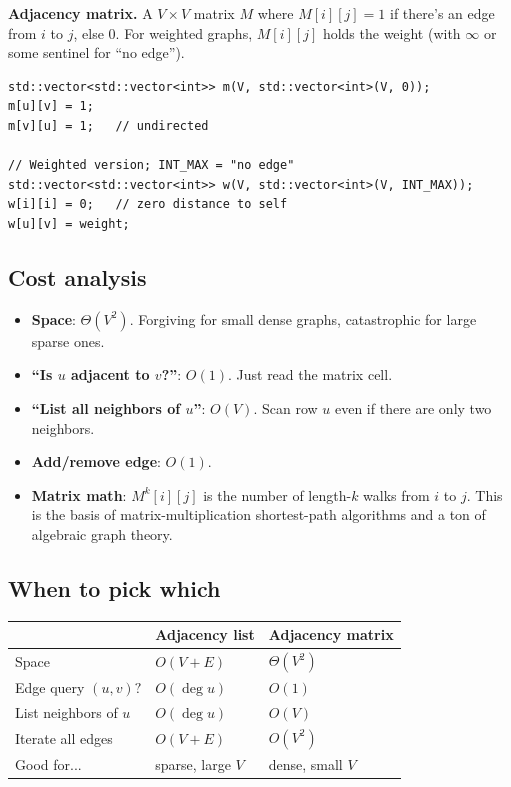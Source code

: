 \documentclass[11pt]{article}
\begin{document}
\begin{defnbox}
\textbf{Adjacency matrix.} A $V \times V$ matrix $M$ where $M[i][j] = 1$ if there's an edge from $i$ to $j$, else $0$. For weighted graphs, $M[i][j]$ holds the weight (with $\infty$ or some sentinel for ``no edge'').
\end{defnbox}

\begin{lstlisting}[basicstyle=\ttfamily\small,frame=single]
std::vector<std::vector<int>> m(V, std::vector<int>(V, 0));
m[u][v] = 1;
m[v][u] = 1;   // undirected

// Weighted version; INT_MAX = "no edge"
std::vector<std::vector<int>> w(V, std::vector<int>(V, INT_MAX));
w[i][i] = 0;   // zero distance to self
w[u][v] = weight;
\end{lstlisting}

\subsection*{Cost analysis}

\begin{itemize}[leftmargin=*]
    \item \textbf{Space}: $\Theta(V^2)$. Forgiving for small dense graphs, catastrophic for large sparse ones.
    \item \textbf{``Is $u$ adjacent to $v$?''}: $O(1)$. Just read the matrix cell.
    \item \textbf{``List all neighbors of $u$''}: $O(V)$. Scan row $u$ even if there are only two neighbors.
    \item \textbf{Add/remove edge}: $O(1)$.
    \item \textbf{Matrix math}: $M^k[i][j]$ is the number of length-$k$ walks from $i$ to $j$. This is the basis of matrix-multiplication shortest-path algorithms and a ton of algebraic graph theory.
\end{itemize}

\subsection*{When to pick which}

\begin{center}
\begin{tabular}{lll}
\hline
& Adjacency list & Adjacency matrix \\
\hline
Space & $O(V+E)$ & $\Theta(V^2)$ \\
Edge query $(u,v)?$ & $O(\deg u)$ & $O(1)$ \\
List neighbors of $u$ & $O(\deg u)$ & $O(V)$ \\
Iterate all edges & $O(V+E)$ & $O(V^2)$ \\
Good for... & sparse, large $V$ & dense, small $V$ \\
\hline
\end{tabular}
\end{center}
\end{document}
